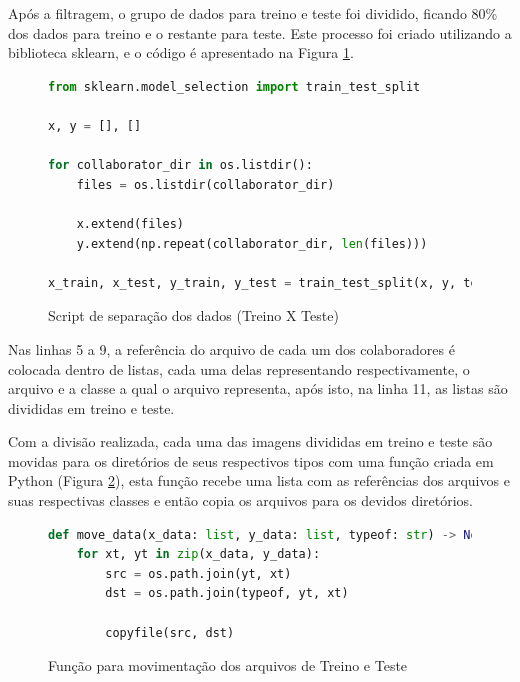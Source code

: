 
\par Após a filtragem, o grupo de dados para treino e teste foi dividido, ficando 80\% dos dados para treino e o restante para teste. Este processo foi criado utilizando a biblioteca sklearn, e o código é apresentado na Figura \ref{figure:split_train_test_data}.

\begin{figure}[H]
    \centering
    \caption{Script de separação dos dados (Treino X Teste)}
    \begin{lstlisting}[language=Python]
from sklearn.model_selection import train_test_split

x, y = [], []

for collaborator_dir in os.listdir():
    files = os.listdir(collaborator_dir)

    x.extend(files)
    y.extend(np.repeat(collaborator_dir, len(files)))

x_train, x_test, y_train, y_test = train_test_split(x, y, test_size=0.20, random_state=992)    
\end{lstlisting}
    \label{figure:split_train_test_data}
\end{figure}

\par Nas linhas 5 a 9, a referência do arquivo de cada um dos colaboradores é colocada dentro de listas, cada uma delas representando respectivamente, o arquivo e a classe a qual o arquivo representa, após isto, na linha 11, as listas são divididas em treino e teste.

\par Com a divisão realizada, cada uma das imagens divididas em treino e teste são movidas para os diretórios de seus respectivos tipos com uma função criada em Python (Figura \ref{figure:move_splitted_data}), esta função recebe uma lista com as referências dos arquivos e suas respectivas classes e então copia os arquivos para os devidos diretórios.

\begin{figure}[H]
    \centering
    \caption{Função para movimentação dos arquivos de Treino e Teste}
    \begin{lstlisting}[language=Python]
def move_data(x_data: list, y_data: list, typeof: str) -> None:
    for xt, yt in zip(x_data, y_data):
        src = os.path.join(yt, xt)
        dst = os.path.join(typeof, yt, xt)
        
        copyfile(src, dst)
\end{lstlisting}
    \label{figure:move_splitted_data}
\end{figure}

